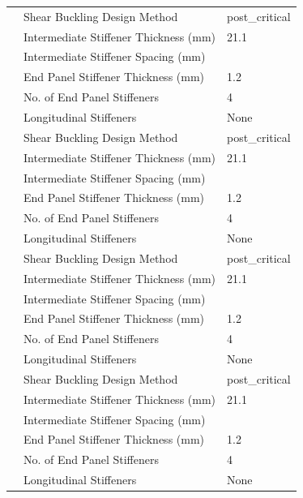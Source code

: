 \documentclass[12pt,a4paper]{report}
\numberwithin{table}{chapter}
\numberwithin{figure}{chapter}
\begin{document}
\begin{longtable}{|C{2.6cm}|L{6.2cm}|L{5.8cm}|}
 & \textnormal{Shear Buckling Design Method} & post\_\allowbreak{}critical \\[6pt]
 & \textnormal{Intermediate Stiffener Thickness (mm)} & 21.1 \\[6pt]
 & \textnormal{Intermediate Stiffener Spacing (mm)} &  \\[6pt]
 & \textnormal{End Panel Stiffener Thickness (mm)} & 1.2 \\[6pt]
 & \textnormal{No. of End Panel Stiffeners} & 4 \\[6pt]
 & \textnormal{Longitudinal Stiffeners} & None \\[6pt]
\hline
{} & \textnormal{Shear Buckling Design Method} & post\_\allowbreak{}critical \\[6pt]
 & \textnormal{Intermediate Stiffener Thickness (mm)} & 21.1 \\[6pt]
 & \textnormal{Intermediate Stiffener Spacing (mm)} &  \\[6pt]
 & \textnormal{End Panel Stiffener Thickness (mm)} & 1.2 \\[6pt]
 & \textnormal{No. of End Panel Stiffeners} & 4 \\[6pt]
 & \textnormal{Longitudinal Stiffeners} & None \\[6pt]
\hline
{} & \textnormal{Shear Buckling Design Method} & post\_\allowbreak{}critical \\[6pt]
 & \textnormal{Intermediate Stiffener Thickness (mm)} & 21.1 \\[6pt]
 & \textnormal{Intermediate Stiffener Spacing (mm)} &  \\[6pt]
 & \textnormal{End Panel Stiffener Thickness (mm)} & 1.2 \\[6pt]
 & \textnormal{No. of End Panel Stiffeners} & 4 \\[6pt]
 & \textnormal{Longitudinal Stiffeners} & None \\[6pt]
\hline
{} & \textnormal{Shear Buckling Design Method} & post\_\allowbreak{}critical \\[6pt]
 & \textnormal{Intermediate Stiffener Thickness (mm)} & 21.1 \\[6pt]
 & \textnormal{Intermediate Stiffener Spacing (mm)} &  \\[6pt]
 & \textnormal{End Panel Stiffener Thickness (mm)} & 1.2 \\[6pt]
 & \textnormal{No. of End Panel Stiffeners} & 4 \\[6pt]
 & \textnormal{Longitudinal Stiffeners} & None \\[6pt]
\hline
\end{longtable}
\end{document}
